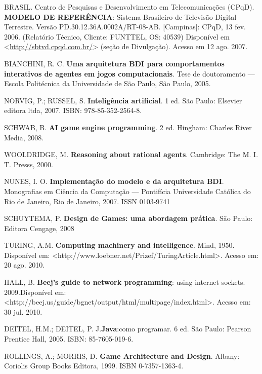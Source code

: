 \begin{thebibliography}{99}
        BRASIL. {C}entro de {P}esquisas e {D}esenvolvimento em {T}elecomunicações ({CPqD}).
        \textbf{MODELO DE REFERÊNCIA}: Sistema Brasileiro de Televisão Digital Terrestre.
        Versão PD.30.12.36A.0002A/RT-08-AB.
        [Campinas]: CPqD, 13 fev. 2006.
        (Relatório Técnico, Cliente: FUNTTEL, OS: 40539)
        Disponível em <\url{http://sbtvd.cpqd.com.br/}> (seção de Divulgação).
        Acesso em 12 ago. 2007.
 
        BIANCHINI, R. C. \textbf{Uma arquitetura BDI para comportamentos interativos de agentes em jogos computacionais}. Tese de doutoramento --- Escola Politécnica da Universidade de São Paulo, São Paulo, 2005.
 
        NORVIG, P.; RUSSEL, S. \textbf{Inteligência artificial}. 1 ed. São Paulo: Elsevier editora ltda, 2007. ISBN: 978-85-352-2564-8.
 
SCHWAB, B. \textbf{AI game engine programming}. 2 ed. Hingham: Charles River Media, 2008.
 
WOOLDRIDGE, M. \textbf{Reasoning about rational agents}. Cambridge: The M. I. T. Presss, 2000.
 
 
NUNES, I. O. \textbf{Implementação do modelo e da arquitetura BDI}. Monografias em Ciência da Computação --- Pontifícia Universidade Católica do Rio de Janeiro, Rio de Janeiro, 2007.
ISSN 0103-9741
 
SCHUYTEMA, P. \textbf{Design de Games: uma abordagem prática}. São Paulo: Editora Cengage, 2008
 
TURING, A.M. \textbf{Computing machinery and intelligence}. Mind, 1950. Disponível em: <http://www.loebner.net/Prizef/TuringArticle.html>. Acesso em: 20 ago. 2010.
 
HALL, B. \textbf{Beej’s guide to network programming}: using internet sockets. 2009.Disponível em: <http://beej.us/guide/bgnet/output/html/multipage/index.html>.
Acesso em: 30 jul. 2010.
 
DEITEL, H.M.; DEITEL, P. J.\textbf{Java}:como programar. 6 ed. São Paulo: Pearson Prentice Hall, 2005. ISBN: 85-7605-019-6.
 
ROLLINGS, A.; MORRIS, D. \textbf{Game Architecture and Design}. Albany: Coriolis Group Books Editora, 1999. ISBN 0-7357-1363-4.
 

\end{thebibliography}
